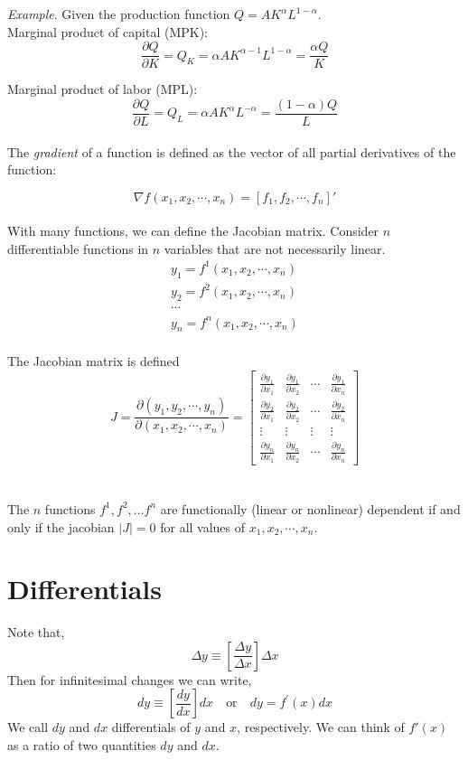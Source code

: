 \documentclass{./../../latex/handout}
\begin{document}
\textit{Example}. Given the production function $ Q = A K^{\alpha} L^{1-\alpha} $. \\
Marginal product of capital (MPK):
	\[\frac{\partial Q}{ \partial K} = Q_K =  \alpha A K^{\alpha-1}L^{1-\alpha}  =  \frac{\alpha Q}{K} \]

Marginal product of labor (MPL):
	\[\frac{\partial Q}{ \partial L} = Q_L = \alpha A K^{\alpha}L^{-\alpha}  =  \frac{(1-\alpha) Q}{L}\] \\

The \textit{gradient} of a function is defined as the vector of all partial derivatives of the function:

\[ \nabla f(x_1, x_2, \cdots, x_n) = [f_1, f_2, \cdots, f_n]' \] \\


With many functions, we can define the Jacobian matrix. Consider $n$ differentiable functions in $n$ variables that are not necessarily linear.
\[
\begin{gathered}
y_{1}=f^{1}\left(x_{1}, x_{2}, \cdots, x_{n}\right) \\
y_{2}=f^{2}\left(x_{1}, x_{2}, \cdots, x_{n}\right) \\
\cdots \\
y_{n}=f^{n}\left(x_{1}, x_{2}, \cdots, x_{n}\right)
\end{gathered}
\] \\
The Jacobian matrix is defined
\[
J=\frac{\partial\left(y_{1}, y_{2}, \cdots, y_{n}\right)}{\partial\left(x_{1}, x_{2}, \cdots, x_{n}\right)}=\left[\begin{array}{llll}
\frac{\partial y_{1}}{\partial x_{1}} & \frac{\partial y_{1}}{\partial x_{2}} & \cdots & \frac{\partial y_{1}}{\partial x_{n}} \\
\frac{\partial y_{2}}{\partial x_{1}} & \frac{\partial y_{2}}{\partial x_{2}} & \cdots & \frac{\partial y_{2}}{\partial x_{n}} \\
\vdots & \vdots & \vdots & \vdots \\
\frac{\partial y_{n}}{\partial x_{1}} & \frac{\partial y_{n}}{\partial x_{2}} & \cdots & \frac{\partial y_{n}}{\partial x_{n}}
\end{array}\right] 
\] \\~\\
The $n$ functions $f^{1}, f^{2}, \ldots f^{n}$ are functionally (linear or nonlinear) dependent if and only if the jacobian $|J|=0$ for all values of $x_{1}, x_{2}, \cdots, x_{n}$.

\section*{Differentials}
Note that, 
\[
\Delta y \equiv\left[\frac{\Delta y}{\Delta x}\right] \Delta x
\] 
Then for infinitesimal changes we can write,
\[
d y \equiv\left[\frac{d y}{d x}\right] d x \quad \text {or} \quad d y=f^{\prime}(x) d x
\] 
We call $d y$ and $dx$ differentials of $y$ and $x$, respectively. We can think of $f'(x)$ as a ratio of two quantities $ dy $ and $dx$. \\
\end{document}
